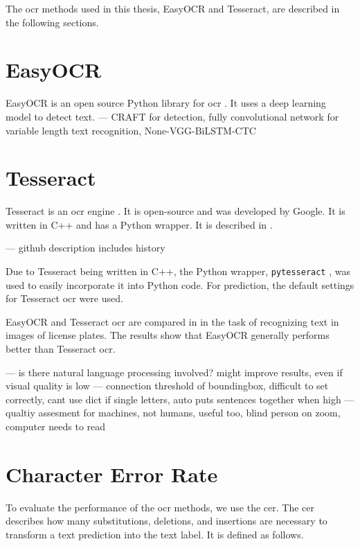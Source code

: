 The \gls{ocr} methods used in this thesis, EasyOCR and Tesseract, are described in the following sections.

\section{EasyOCR}
\label{subsec:easyocr}

EasyOCR is an open source Python library for \gls{ocr} \cite{easyocr_2020}. It uses a deep learning model to detect text.
--- CRAFT for detection, fully convolutional network for variable length text recognition, None-VGG-BiLSTM-CTC


\section{Tesseract}
\label{subsec:tesseract}

Tesseract is an \gls{ocr} engine \cite{tesseract_2007}. It is open-source and was developed by Google. It is written in C++ and has a Python wrapper.
It is described in \cite{ocr_survey_tess_2013}.

--- github description includes history

Due to Tesseract being written in C++, the Python wrapper, \texttt{pytesseract} \cite{pytesseract_2022}, was used to easily incorporate it into Python code.
For prediction, the default settings for Tesseract \gls{ocr} were used.

EasyOCR and Tesseract \gls{ocr} are compared in \cite{ocr_tess_vs_easyocr_2022} in the task of recognizing text in images of license plates.
The results show that EasyOCR generally performs better than Tesseract \gls{ocr}.


--- is there natural language processing involved? might improve results, even if visual quality is low
--- connection threshold of boundingbox, difficult to set correctly, cant use dict if single letters, auto puts sentences together when high
--- qualtiy assesment for machines, not humans, useful too, blind person on zoom, computer needs to read

\section{Character Error Rate}
\label{subsec:cer}

To evaluate the performance of the \gls{ocr} methods, we use the \gls{cer}.
The \gls{cer} \cite{cer_2022} describes how many substitutions, deletions, and insertions are necessary to transform a text prediction into the text label.
It is defined as follows.

